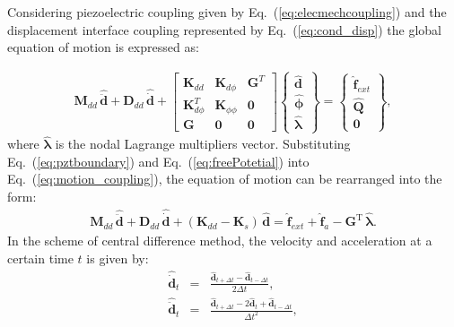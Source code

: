 Considering piezoelectric coupling given by Eq.~(\ref{eq:elecmechcoupling}) and the displacement interface coupling represented by Eq.~(\ref{eq:cond_disp}) the global equation of motion is expressed as:

\begin{eqnarray}
	\label{eq:motion_coupling}
	\textbf{M}_{dd}\,\widehat{\ddot{\textbf{d}}} +
	\textbf{D}_{dd}\,\widehat{\dot{\textbf{d}}} +
	\left [\begin{array}{ccc}
		\textbf{K}_{dd}&\textbf{K}_{d\phi}&\textbf{G}^T\\
		\textbf{K}_{d\phi}^T&\textbf{K}_{\phi \phi}&\textbf{0}\\
		\textbf{G}&\textbf{0}&\textbf{0}
	\end{array}\right]
	\left \{\begin{array}{c}
		\widehat{\textbf{d}}\\
		\widehat{\boldsymbol{\phi}}\\
		\widehat{\boldsymbol{\lambda}}
	\end{array}\right\} =
	\left \{\begin{array}{c}
		\widehat{\textbf{f}}_{ext} \\
		\widehat{\textbf{Q}}\\
		\textbf{0}
	\end{array}\right \},
\end{eqnarray}
%
where \(\widehat{\boldsymbol{\lambda}}\) is the nodal Lagrange multipliers vector.
Substituting Eq.~(\ref{eq:pztboundary}) and Eq.~(\ref{eq:freePotetial}) into Eq.~(\ref{eq:motion_coupling}), the equation of motion can be rearranged into the form:
\begin{eqnarray}
	\textbf{M}_{dd}\,\widehat{\ddot{\textbf{d}}} + \textbf{D}_{dd} \,\widehat{\dot{\textbf{d}}} + (\textbf{K}_{dd}-\textbf{K}_{s}) \,\widehat{\textbf{d}}  = \widehat{\textbf{f}}_{ext} + \widehat{\textbf{f}}_{a} - \textbf{G}^{\mathrm{T}}\,\widehat{\boldsymbol{\lambda}}.
	\label{eq:motionD}
\end{eqnarray}
In the scheme of central difference method, the velocity and acceleration at a certain time \(t\) is given by:
\begin{eqnarray}
	\label{eq:v}
	\widehat{\dot{\textbf{d}}}_{t} & = & \frac{\widehat{\textbf{d}}_{t+\Delta t} - \widehat{\textbf{d}}_{t-\Delta t}}{2\Delta t},\\
	\label{eq:a}
	\widehat{\ddot{\textbf{d}}}_{t} & = & \frac{\widehat{\textbf{d}}_{t+\Delta t} - 2\widehat{\textbf{d}}_{t} + \widehat{\textbf{d}}_{t-\Delta t}}{\Delta t^2},
\end{eqnarray}
